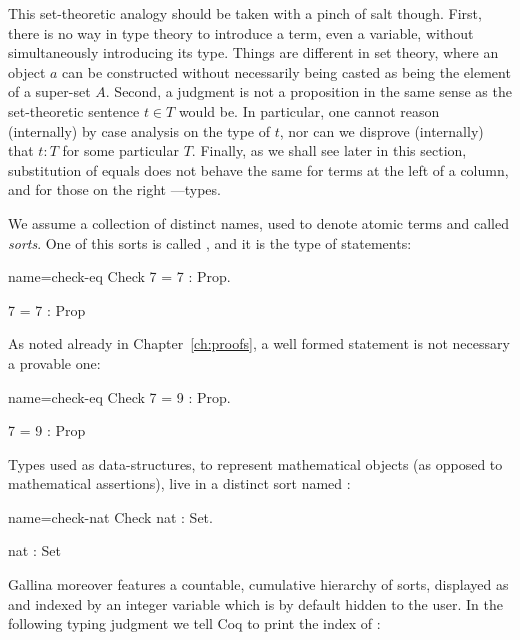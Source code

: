 This set-theoretic analogy should be taken with a pinch of salt
though. First, there is no way in type theory to introduce a term, even
a variable, without simultaneously introducing its type. Things are
different in set theory, where an object $a$ can be constructed without
necessarily being casted as being the element of a super-set
$A$. Second, a judgment is not a proposition in the same sense as the
set-theoretic sentence $t \in T$ would be. In particular, one cannot
reason (internally) by case analysis on the type of
$t$, nor can we disprove (internally) that $t : T$ for some particular
$T$. Finally, as we shall see later in this section, substitution of
equals does not behave the same for terms at the left of a column, and
for those on the right ---types.


We assume a collection of distinct names, used to denote atomic terms
and called \emph{sorts}.  One of this sorts is called , and it
is the type of statements:

\begin{coq-left}{name=check-eq}{}
Check 7 = 7 : Prop.
\end{coq-left}
\begin{coqout-right}
7 = 7 : Prop
\end{coqout-right}

As noted already in Chapter~\ref{ch:proofs}, a well formed statement
is not necessary a provable one:

\begin{coq-left}{name=check-eq}{}
Check 7 = 9 : Prop.
\end{coq-left}
\begin{coqout-right}
7 = 9 : Prop
\end{coqout-right}

Types used as data-structures, to represent mathematical objects (as
opposed to mathematical assertions), live in a distinct sort named
:

\begin{coq-left}{name=check-nat}{}
Check nat : Set.
\end{coq-left}
\begin{coqout-right}
nat : Set
\end{coqout-right}

Gallina moreover features a countable, cumulative hierarchy of sorts,
displayed as  and indexed by an integer variable which is by
default hidden to the user.  In the following typing judgment we tell Coq
to print the index of :

